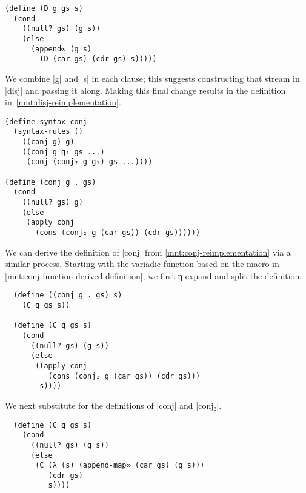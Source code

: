 \documentclass[sigplan,draft,natbib=false]{acmart}
\begin{document}
\begin{listing}[h]
\begin{verbatim}
(define (D g gs s)
  (cond
    ((null? gs) (g s))
    (else
      (append∞ (g s)
        (D (car gs) (cdr gs) s)))))
\end{verbatim}
  \caption{Derivation of \rackinline|disj| function definition}
  \label{mnt:disj-substituted-through}
\end{listing}

\noindent We combine \rackinline|g| and \rackinline|s| in each clause;
this suggests constructing that stream in \rackinline|disj| and
passing it along. Making this final change results in the definition
in~\cref{mnt:disj-reimplementation}.


\begin{listing}[h]
\begin{verbatim}
(define-syntax conj
  (syntax-rules ()
    ((conj g) g)
    ((conj g g₁ gs ...)
     (conj (conj₂ g g₁) gs ...))))

(define (conj g . gs)
  (cond
    ((null? gs) g)
    (else
     (apply conj
       (cons (conj₂ g (car gs)) (cdr gs))))))
\end{verbatim}
  \caption{\rackinline|conj₂|-based \rackinline|conj| function and macro}
  \label{mnt:conj-function-derived-definition}
\end{listing}

We can derive the definition of \rackinline|conj| from
\cref{mnt:conj-reimplementation} via a similar process. Starting with
the variadic function based on the macro in
\cref{mnt:conj-function-derived-definition}, we first η-expand and
split the definition.

\begin{listing}[h]
\begin{verbatim}
  (define ((conj g . gs) s)
    (C g gs s))

  (define (C g gs s)
    (cond
      ((null? gs) (g s))
      (else
       ((apply conj
          (cons (conj₂ g (car gs)) (cdr gs)))
        s))))
\end{verbatim}
  \caption{Derivation of split \rackinline|conj| function definition}
  \label{mnt:conj-substituted-through}
\end{listing}
\noindent We next substitute for the definitions of \rackinline|conj| and
\rackinline|conj₂|.

\begin{listing}[h]
\begin{verbatim}
  (define (C g gs s)
    (cond
      ((null? gs) (g s))
      (else
       (C (λ (s) (append-map∞ (car gs) (g s)))
          (cdr gs)
          s))))
\end{verbatim}
  \caption{Replacing \rackinline|apply| in \rackinline|C| function definition}
  \label{mnt:C-substituted-through}
\end{listing}
\end{document}
